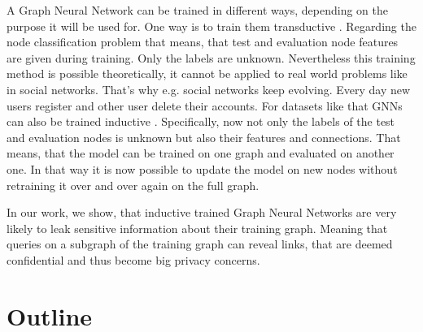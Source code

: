 		A Graph Neural Network can be trained in different ways, depending on the purpose it will be used for.
		One way is to train them transductive \cite{5206871, ZHA2010187, WANG2017218, 10.1007/978-3-642-04174-7_29}.
		Regarding the node classification problem that means, that test and evaluation node features are given during training.
		Only the labels are unknown.
		Nevertheless this training method is possible theoretically, it cannot be applied to real world problems like in social networks.
		That's why e.g. social networks keep evolving.
		Every day new users register and other user delete their accounts.
		For datasets like that GNNs can also be trained inductive \cite{zeng2020graphsaint, 8519335, zhang2020document}.
		Specifically, now not only the labels of the test and evaluation nodes is unknown but also their features and connections.
		That means, that the model can be trained on one graph and evaluated on another one.
		In that way it is now possible to update the model on new nodes without retraining it over and over again on the full graph.

		In our work, we show, that inductive trained Graph Neural Networks are very likely to leak sensitive information about their training graph. 
		Meaning that queries on a subgraph of the training graph can reveal links, that are deemed confidential and thus become big privacy concerns.

	\section{Outline}
